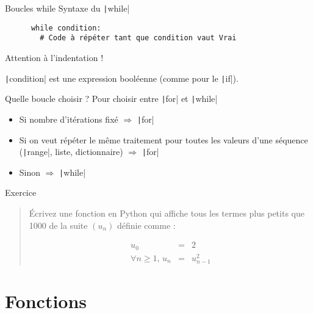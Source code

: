 \documentclass[10pt]{beamer}
\begin{document}
\begin{frame}[fragile]{Boucles while}  
  Syntaxe du \texttt|while|
  \begin{beamercodeblock}
    \begin{verbatim}
      while condition:
        # Code à répéter tant que condition vaut Vrai
    \end{verbatim}
  \end{beamercodeblock}
  Attention à \alert{l'indentation} !

  \texttt|condition| est une expression booléenne (comme pour le \texttt|if|).
\end{frame}

\begin{frame}[fragile]{Quelle boucle choisir ?}  
  Pour choisir entre  \texttt|for| et \texttt|while|
  
  \begin{itemize}
    \item Si nombre d'itérations fixé $\Rightarrow$ \texttt|for|
    \item Si on veut répéter le même traitement pour toutes les valeurs d'une séquence (\texttt|range|, liste, dictionnaire) $\Rightarrow$ \texttt|for|
    \item Sinon $\Rightarrow$ \texttt|while|
  \end{itemize}
\end{frame}

\begin{frame}{Exercice}
  \begin{quote}
    Écrivez une fonction en Python qui affiche tous les termes plus petits que 1000 de la suite $(u_n)$ définie comme :

$$
\begin{array}{rcc}u_0 & = & 2 \\
\forall n \geq 1, \, u_n & = & u_{n-1}^2\end{array}
$$
  \end{quote}
\end{frame}

\section{Fonctions}
\end{document}
